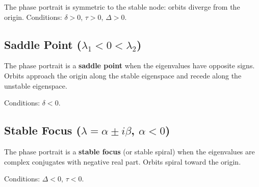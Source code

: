\begin{definition}
The phase portrait is symmetric to the stable node: orbits diverge from the
origin. Conditions: $\delta > 0$, $\tau > 0$, $\Delta > 0$.
\end{definition}

\subsection{Saddle Point ($\lambda_1 < 0 < \lambda_2$)}

\begin{definition}
The phase portrait is a \textbf{saddle point} when the eigenvalues have
opposite signs. Orbits approach the origin along the stable eigenspace and
recede along the unstable eigenspace.
\end{definition}

Conditions: $\delta < 0$.

\begin{center}
\end{center}

\subsection{Stable Focus ($\lambda = \alpha \pm i\beta$, $\alpha < 0$)}

\begin{definition}
The phase portrait is a \textbf{stable focus} (or stable spiral) when the
eigenvalues are complex conjugates with negative real part. Orbits spiral
toward the origin.
\end{definition}

Conditions: $\Delta < 0$, $\tau < 0$.

